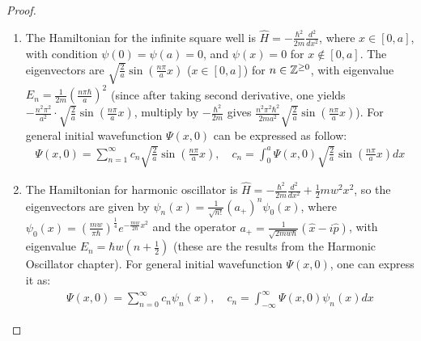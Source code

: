 \documentclass{article}
\begin{document}
\begin{proof}
\begin{enumerate}
        \item The Hamiltonian for the infinite square well is $\hat{H}=-\frac{\hbar^2}{2m}\frac{d^2}{dx^2}$, where $x\in [0,a]$, with condition $\psi(0)=\psi(a)=0$, and $\psi(x)=0$ for $x\notin [0,a]$. The eigenvectors are $\sqrt{\frac{2}{a}}\sin\left(\frac{n\pi}{a}x\right)$ ($x\in[0,a]$) for $n\in\mathbb{Z}^{\geq 0}$, with eigenvalue $E_n = \frac{1}{2m}\left(\frac{n\pi\hbar}{a}\right)^2$ (since after taking second derivative, one yields $-\frac{n^2\pi^2}{a^2}\cdot\sqrt{\frac{2}{a}}\sin\left(\frac{n\pi}{a}x\right)$, multiply by $-\frac{\hbar^2}{2m}$ gives $\frac{n^2\pi^2\hbar^2}{2ma^2}\sqrt{\frac{2}{a}}\sin\left(\frac{n\pi}{a}x\right)$). For general initial wavefunction $\Psi(x,0)$ can be expressed as follow:
        \begin{align}
            \Psi(x,0)=\sum_{n=1}^{\infty}c_n \sqrt{\frac{2}{a}}\sin\left(\frac{n\pi}{a}x\right),\quad c_n = \int_{0}^{a}\Psi(x,0)\sqrt{\frac{2}{a}}\sin\left(\frac{n\pi}{a}x\right)dx
        \end{align}

        \hfil

        \item The Hamiltonian for harmonic oscillator is $\hat{H}=-\frac{\hbar^2}{2m}\frac{d^2}{dx^2}+\frac{1}{2}mw^2x^2$, so the eigenvectors are given by $\psi_n(x) = \frac{1}{\sqrt{n!}}(a_+)^n\psi_0(x)$, where $\psi_0(x)=\left(\frac{mw}{\pi\hbar}\right)^\frac{1}{4}e^{-\frac{mw}{2\hbar}x^2}$ and the operator $a_+ = \frac{1}{\sqrt{2mw\hbar}}(\hat{x}-i\hat{p})$, with eigenvalue $E_n = \hbar w\left(n+\frac{1}{2}\right)$ (these are the results from the Harmonic Oscillator chapter). For general initial wavefunction $\Psi(x,0)$, one can express it as:
        \begin{align}
            \Psi(x,0) = \sum_{n=0}^{\infty}c_n \psi_n(x),\quad c_n=\int_{-\infty}^{\infty}\Psi(x,0)\psi_n(x)dx
        \end{align}

        \hfil


\end{enumerate}
\end{proof}
\end{document}
